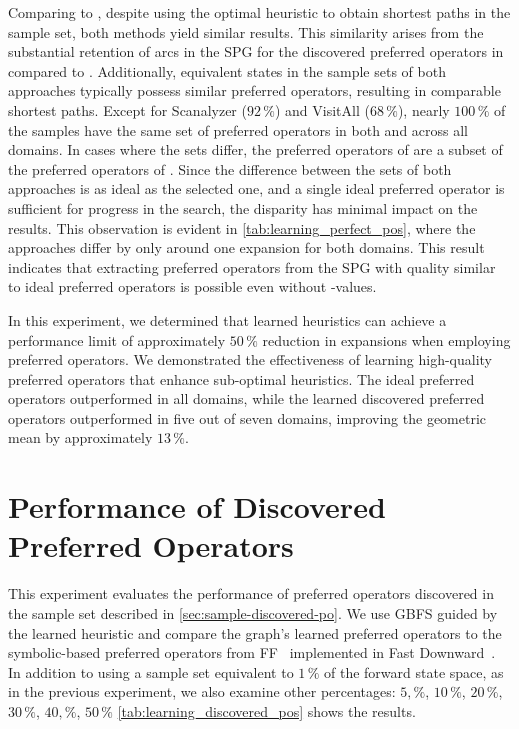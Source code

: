 \documentclass[ppgc,diss,english]{iiufrgs}
\begin{document}
Comparing \pogstar to \pog, despite \pogstar using the optimal heuristic \hstar to obtain shortest paths in the sample set, both methods yield similar results. This similarity arises from the substantial retention of arcs in the SPG for the discovered preferred operators in \pog compared to \pogstar. Additionally, equivalent states in the sample sets of both approaches typically possess similar preferred operators, resulting in comparable shortest paths. Except for Scanalyzer ($92\,\%$) and VisitAll ($68\,\%$), nearly $100\,\%$ of the samples have the same set of preferred operators in both \pogstar and \pog across all domains. In cases where the sets differ, the preferred operators of \pog are a subset of the preferred operators of \pogstar. Since the difference between the sets of both approaches is as ideal as the selected one, and a single ideal preferred operator is sufficient for progress in the search, the disparity has minimal impact on the results. This observation is evident in \cref{tab:learning_perfect_pos}, where the approaches differ by only around one expansion for both domains. This result indicates that extracting preferred operators from the SPG with quality similar to ideal preferred operators is possible even without \hstar-values.

In this experiment, we determined that learned heuristics can achieve a performance limit of approximately $50\,\%$ reduction in expansions when employing preferred operators. We demonstrated the effectiveness of learning high-quality preferred operators that enhance sub-optimal heuristics. The ideal preferred operators \postar outperformed \hnn in all domains, while the learned discovered preferred operators \pog outperformed \hnn in five out of seven domains, improving the geometric mean by approximately $13\,\%$.

\section{Performance of Discovered Preferred Operators}
\label{sec:exp-performance-po}
This experiment evaluates the performance of preferred operators discovered in the sample set described in \cref{sec:sample-discovered-po}. We use GBFS guided by the learned heuristic \hnn and compare the graph's learned preferred operators \pog to the symbolic-based preferred operators \poff from FF~\cite{Hoffmann.Nebel/2001} implemented in Fast Downward~\cite{Helmert/2006}. In addition to using a sample set equivalent to $1\,\%$ of the forward state space, as in the previous experiment, we also examine other percentages: $5,\%$, $10\,\%$, $20\,\%$, $30\,\%$, $40,\%$, $50\,\%$ \cref{tab:learning_discovered_pos} shows the results.
\end{document}
